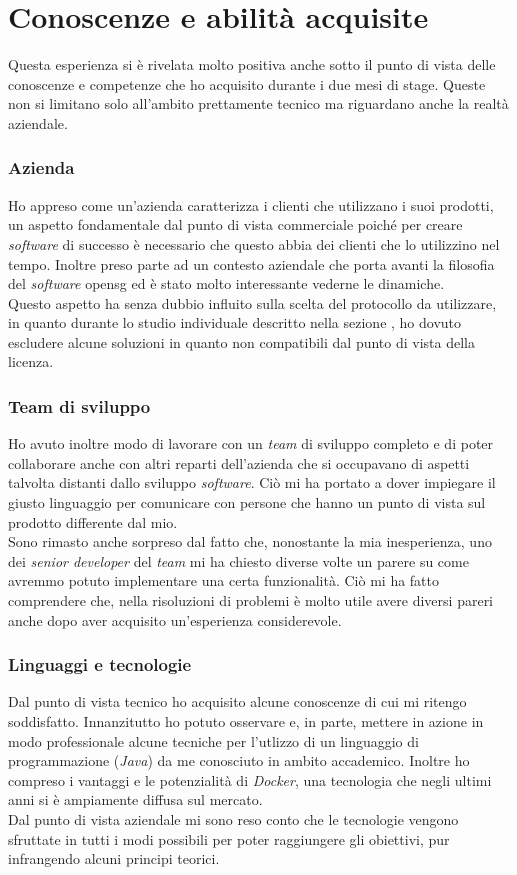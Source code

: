 \newpage

\section{Conoscenze e abilità acquisite}
Questa esperienza si è rivelata molto positiva anche sotto il punto di vista delle conoscenze e competenze che ho acquisito durante i due mesi di stage.
Queste non si limitano solo all'ambito prettamente tecnico ma riguardano anche la realtà aziendale. 
\subsubsection{Azienda}
Ho appreso come un'azienda caratterizza i clienti che utilizzano i suoi prodotti, un aspetto fondamentale dal punto di vista commerciale poiché per creare \textit{software} di successo è necessario che questo abbia dei clienti che lo utilizzino nel tempo. Inoltre preso parte ad un contesto aziendale che porta avanti la filosofia del \textit{software} \gls{opensg} ed è stato molto interessante vederne le dinamiche. \\
Questo aspetto ha senza dubbio influito sulla scelta del protocollo da utilizzare, in quanto durante lo studio individuale descritto nella sezione , ho dovuto escludere alcune soluzioni in quanto non compatibili dal punto di vista della licenza.

\subsubsection{Team di sviluppo}
Ho avuto inoltre modo di lavorare con un \textit{team} di sviluppo completo e di poter collaborare anche con altri reparti dell'azienda che si occupavano di aspetti talvolta distanti dallo sviluppo \textit{software}. Ciò mi ha portato a dover impiegare il giusto linguaggio per comunicare con persone che hanno un punto di vista sul prodotto differente dal mio. \\
Sono rimasto anche sorpreso dal fatto che, nonostante la mia inesperienza, uno dei \textit{senior developer} del \textit{team} mi ha chiesto diverse volte un parere su come avremmo potuto implementare una certa funzionalità. Ciò mi ha fatto comprendere che, nella risoluzioni di problemi è molto utile avere diversi pareri anche dopo aver acquisito un'esperienza considerevole.

\subsubsection{Linguaggi e tecnologie}
Dal punto di vista tecnico ho acquisito alcune conoscenze di cui mi ritengo soddisfatto. Innanzitutto ho potuto osservare e, in parte, mettere in azione in modo professionale alcune tecniche per l'utlizzo di un linguaggio di programmazione (\textit{Java}) da me conosciuto in ambito accademico.
Inoltre ho compreso i vantaggi e le potenzialità di \textit{Docker}, una tecnologia che negli ultimi anni si è ampiamente diffusa sul mercato. \\
Dal punto di vista aziendale mi sono reso conto che le tecnologie vengono sfruttate in tutti i modi possibili per poter raggiungere gli obiettivi, pur infrangendo alcuni principi teorici.

